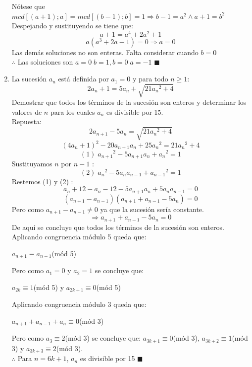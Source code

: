 \documentclass{book}
\begin{document}
\begin{enumerate}
          Nótese que $mcd[(a + 1);a] = mcd[(b - 1);b] = 1 \Rightarrow b - 1 = a^2 \wedge a + 1 = b^2$\\
          Despejando y sustituyendo se tiene que:
          $$a + 1 = a^4 + 2a^2 + 1$$
          $$a(a^3 + 2a - 1) = 0 \Rightarrow a = 0$$
          Las demás soluciones no son enteras. Falta considerar cuando $b= 0$\\
          $\therefore$ Las soluciones son $a= 0 \; b= 1, b= 0\; a= -1$ $\blacksquare$\\
    \item La sucesión $a_n$ está definida por $a_1 = 0$ y para todo $n\geq 1$:
          $$2a_n+1 = 5a_n + \sqrt{21{a_n}^2 + 4}$$
          Demostrar que todos los términos de la sucesión son enteros y determinar los valores de $n$ para los cuales $a_n$                       es divisible por 15.\\
          Repuesta:
          $$2a_{n+1} - 5a_n = \sqrt{21{a_n}^2 + 4}$$
          $${(4a_n+1)}^2 - 20a_{n+1}a_n + 25{a_n}^2 = 21{a_n}^2 + 4$$
          $$(1)\; {a_{n+1}}^2 - 5a_{n+1}a_n + {a_n}^2 = 1$$
          Sustituyamos  $n$ por $n - 1$ :
          $$(2)\;{a_n}^2 - 5a_n a_{n-1} + {a_{n-1}}^2 = 1$$
          Restemos (1) y (2) :
          $$a_n+12 - a_n-12 - 5a_{n+1}a_n + 5a_na_{n-1} = 0$$
          $$(a_{n+1} - a_{n-1})(a_{n+1} + a_{n-1} - 5a_n) = 0$$
          Pero como $a_{n+1} - a_{n-1} \neq 0$ ya que la sucesión sería constante.
          $$\Rightarrow a_{n+1} + a_{n-1} - 5a_n = 0$$
          De aquí se concluye que todos los términos de la sucesión son enteros.\\
          Aplicando congruencia módulo 5 queda que:
          \begin{center}
              $a_{n+1} \equiv a_{n-1}$(mód 5)
          \end{center}
          Pero como $a_1 = 0$ y $a_2 = 1$ se concluye que:
          \begin{center}
              $a_{2k} \equiv 1$(mód 5) y $a_{2k+1} \equiv 0$(mód 5)
          \end{center}
          Aplicando congruencia módulo 3 queda que:
          \begin{center}
              $a_{n+1} + a_{n-1} + a_n \equiv 0$(mód 3)
          \end{center}
          Pero como $a_3 \equiv 2$(mód 3) se concluye que: $a_{3k+1} \equiv 0$(mód 3),  $a_{3k+2} \equiv 1$(mód 3) y  $a_{3k+3} \equiv 2$(mód 3). \\
          $\therefore$ Para $n = 6k + 1$, $a_n$ es divisible por 15 $\blacksquare$\\

\end{enumerate}
\end{document}
